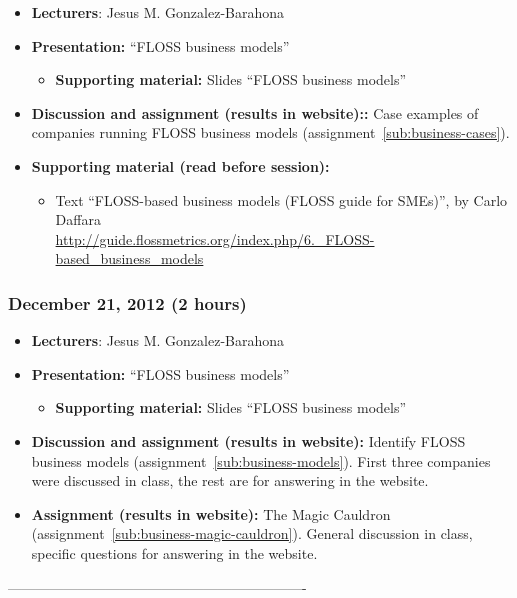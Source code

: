 \documentclass[a4paper]{article}
\begin{document}
\begin{itemize}
\item \textbf{Lecturers}: Jesus M. Gonzalez-Barahona
\item \textbf{Presentation:} ``FLOSS business models''
  \begin{itemize}
  \item \textbf{Supporting material:} Slides ``FLOSS business models''
  \end{itemize}
\item \textbf{Discussion and assignment (results in website)::} Case examples of companies running FLOSS business models (assignment~\ref{sub:business-cases}).
\item \textbf{Supporting material (read before session):}
  \begin{itemize}
  \item Text ``FLOSS-based business models (FLOSS guide for SMEs)'', by Carlo Daffara \\
    \url{http://guide.flossmetrics.org/index.php/6._FLOSS-based_business_models}
  \end{itemize}
\end{itemize}

\subsubsection{December 21, 2012 (2 hours)}

\begin{itemize}
\item \textbf{Lecturers}: Jesus M. Gonzalez-Barahona
\item \textbf{Presentation:} ``FLOSS business models''
  \begin{itemize}
  \item \textbf{Supporting material:} Slides ``FLOSS business models''
  \end{itemize}
\item \textbf{Discussion and assignment (results in website):} Identify FLOSS
business models (assignment~\ref{sub:business-models}). First three companies were discussed in class, the rest are for answering in the website.
\item \textbf{Assignment (results in website):} The Magic Cauldron (assignment~\ref{sub:business-magic-cauldron}). General discussion in class, specific questions for answering in the website.
\end{itemize}

----------------------------------------------------------------
\end{document}
